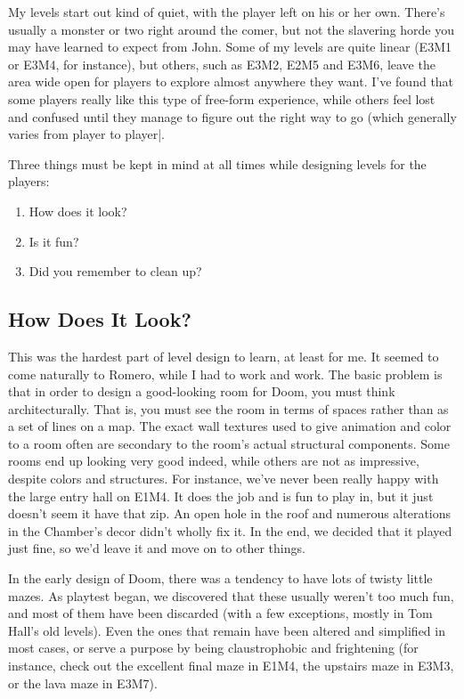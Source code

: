    \par
    My levels start out kind of quiet, with the player left on his or her own. There's usually a monster or two right around the comer, but not the slavering horde you may have learned to expect from John. Some of my levels are quite linear (E3M1 or E3M4, for instance), but others, such as E3M2, E2M5 and E3M6, leave the area wide open for players to explore almost anywhere they want. I've found that some players really like this type of free-form experience, while others feel lost and confused until they manage to figure out the right way to go (which generally varies from player to player|.\\
    \par
     Three things must be kept in mind at all times while designing levels for the players:
\begin{enumerate}
\item How does it look?
\item Is it fun?
\item Did you remember to clean up?
\end{enumerate}
\par

\subsection{How Does It Look?}

This was the hardest part of level design to learn, at least for me. It seemed to come naturally to Romero, while I had to work and work. The basic problem is that in order to design a good-looking room for Doom, you must think architecturally. That is, you must see the room in terms of spaces rather than as a set of lines on a map. The exact wall textures used to give animation and color to a room often are secondary to the room's actual structural components. Some rooms end up looking very good indeed, while others are not as impressive, despite colors and structures. For instance, we've never been really happy with the large entry hall on E1M4. It does the job and is fun to play in, but it just doesn't seem it have that zip. An open hole in the roof and numerous alterations in the Chamber's decor didn't wholly fix it. In the end, we decided that it played just fine, so we'd leave it and move on to other things.\\
\par
 In the early design of Doom, there was a tendency to have lots of twisty little mazes. As playtest began, we discovered that these usually weren't too much fun, and most of them have been discarded (with a few exceptions, mostly in Tom Hall's old levels). Even the ones that remain have been altered and simplified in most cases, or serve a purpose by being claustrophobic and frightening (for instance, check out the excellent final maze in E1M4, the upstairs maze in E3M3, or the lava maze in E3M7).

